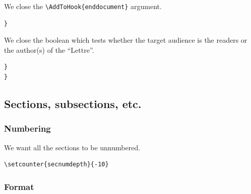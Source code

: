 \documentclass{letgut}
\begin{document}
We close the \lstinline+\AddToHook{enddocument}+ argument.

\begin{lstlisting}
}
\end{lstlisting}

We close the boolean which tests whether the target audience is the readers or
the author(s) of the “Lettre”.

\begin{lstlisting}
}
}
\end{lstlisting}

\subsection{Sections, subsections, etc.}
\label{sec:org4d2fa9d}

\subsubsection{Numbering}
\label{sec:orge3d86f9}
We want all the sections to be unnumbered.

\begin{lstlisting}
\setcounter{secnumdepth}{-10}
\end{lstlisting}

\subsubsection{Format}
\label{sec:org36330f3}
\end{document}
